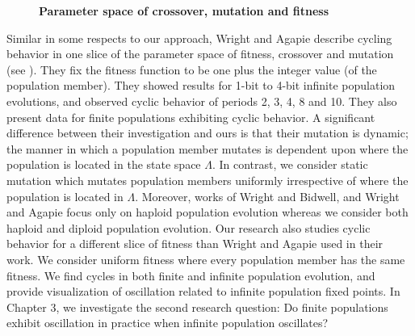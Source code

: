 \begin{itemize}
{\begin{figure}[h]
\begin{center}
\hspace{-3em}%
\caption[\textbf{Parameter space of crossover, mutation and fitness}]{\textbf{Parameter space of crossover, mutation and fitness}  }
\label{fig_cmf}
\end{center}
\end{figure}

Similar in some respects to our approach, Wright and Agapie describe cycling behavior in one slice of 
the parameter space of fitness, crossover and mutation (see \cite{Wright2001}). 
They fix the fitness function to be one plus the integer value (of the population member).  
They showed results for 1-bit to 4-bit 
infinite population evolutions, and observed cyclic behavior of periods 2, 3, 4, 8 and 10. 
They also present data for finite populations exhibiting cyclic behavior. A significant difference between 
their investigation and ours is that their mutation is dynamic; the manner in which a population member mutates 
is dependent upon where the population is located in the state space $\Lambda$. In contrast, we consider static mutation which 
mutates population members uniformly irrespective of where the population is located in $\Lambda$. 
Moreover, works of Wright and Bidwell, and Wright and Agapie focus only on haploid population evolution 
whereas we consider both haploid and diploid population evolution.
Our research also studies cyclic behavior for a different slice of fitness   
than Wright and Agapie used in their work. 
We consider uniform fitness where every population member has the same fitness.
We find cycles in both finite and infinite population evolution, 
and provide visualization of oscillation related to infinite population fixed points. 
In Chapter 3, we investigate the second research question: Do 
finite populations exhibit oscillation in practice when infinite population oscillates? 
}


\end{itemize}
